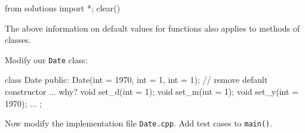 \begin{python0}
from solutions import *; clear()
\end{python0}

The above information on default values for functions also applies to
methods of classes.

Modify our \texttt{Date} class:

\begin{consolethree}[escapeinside=||]
class Date
{
public:
    Date(int = 1970, int = 1, int = 1);
    // remove default constructor ... why?
    void set_d(int = 1);
    void set_m(int = 1);
    void set_y(int = 1970);
    ...
};
\end{consolethree}

Now modify the implementation file \texttt{Date.cpp}. Add test cases to
\texttt{main()}.




